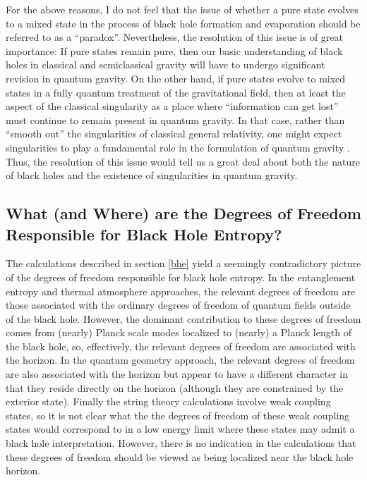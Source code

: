 \documentclass[12pt]{article}
\begin{document}
For the above reasons, I do not feel that the issue of whether a pure
state evolves to a mixed state in the process of black hole formation
and evaporation should be referred to as a ``paradox''. Nevertheless,
the resolution of this issue is of great importance: If pure states
remain pure, then our basic understanding of black holes in classical
and semiclassical gravity will have to undergo significant revision in
quantum gravity. On the other hand, if pure states evolve to mixed
states in a fully quantum treatment of the gravitational field, then
at least the aspect of the classical singularity as a place where
``information can get lost'' must continue to remain present in
quantum gravity. In that case, rather than ``smooth out'' the
singularities of classical general relativity, one might expect
singularities to play a fundamental role in the formulation of quantum
gravity \cite{p}. Thus, the resolution of this issue would tell us a
great deal about both the nature of black holes and the existence of
singularities in quantum gravity.

\subsection{What (and Where) are the Degrees of Freedom Responsible for 
Black Hole Entropy?}
\label{dof}

The calculations described in section \ref{bhe} yield a seemingly
contradictory picture of the degrees of freedom responsible for black
hole entropy. In the entanglement entropy and thermal atmosphere
approaches, the relevant degrees of freedom are those associated with
the ordinary degrees of freedom of quantum fields outside of the black
hole. However, the dominant contribution to these degrees of freedom
comes from (nearly) Planck scale modes localized to (nearly) a Planck
length of the black hole, so, effectively, the relevant degrees of
freedom are associated with the horizon. In the quantum geometry
approach, the relevant degrees of freedom are also associated with the
horizon but appear to have a different character in that they reside
directly on the horizon (although they are constrained by the exterior
state). Finally the string theory calculations involve weak coupling
states, so it is not clear what the the degrees of
freedom of these weak coupling states would correspond to in a low
energy limit where these states may admit a black hole
interpretation. However, there is no indication in the calculations
that these degrees of freedom should be viewed as being localized near
the black hole horizon.
\end{document}
